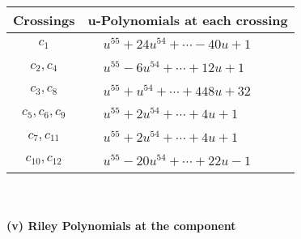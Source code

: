 \documentclass[1p]{elsarticle_modified}
\theoremstyle{definition}
\begin{document}
\begin{tabular}{m{50pt}|m{274pt}}
Crossings & \hspace{64pt}u-Polynomials at each crossing \\
\hline $$\begin{aligned}c_{1}\end{aligned}$$&$\begin{aligned}
&u^{55}+24 u^{54}+\cdots-40 u+1
\end{aligned}$\\
\hline $$\begin{aligned}c_{2},c_{4}\end{aligned}$$&$\begin{aligned}
&u^{55}-6 u^{54}+\cdots+12 u+1
\end{aligned}$\\
\hline $$\begin{aligned}c_{3},c_{8}\end{aligned}$$&$\begin{aligned}
&u^{55}+u^{54}+\cdots+448 u+32
\end{aligned}$\\
\hline $$\begin{aligned}c_{5},c_{6},c_{9}\end{aligned}$$&$\begin{aligned}
&u^{55}+2 u^{54}+\cdots+4 u+1
\end{aligned}$\\
\hline $$\begin{aligned}c_{7},c_{11}\end{aligned}$$&$\begin{aligned}
&u^{55}+2 u^{54}+\cdots+4 u+1
\end{aligned}$\\
\hline $$\begin{aligned}c_{10},c_{12}\end{aligned}$$&$\begin{aligned}
&u^{55}-20 u^{54}+\cdots+22 u-1
\end{aligned}$\\
\hline
\end{tabular}\\~\\
\newpage\renewcommand{\arraystretch}{1}
\flushleft \textbf{(v) Riley Polynomials at the component}\newline \\
\end{document}
